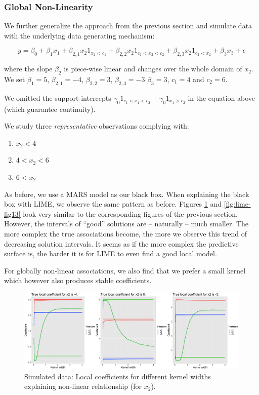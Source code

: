 \documentclass[]{krantz}
\begin{document}
\subsubsection{Global Non-Linearity}\label{id413}

We further generalize the approach from the previous section and
simulate data with the underlying data generating mechanism:

\[ y = \beta_0 + \beta_1 x_1 + \beta_{2,1} x_2 1_{x_2<c_1} + \beta_{2,2} x_2 1_{c_1 < x_2 < c_2} +  \beta_{2,3} x_2 1_{c_2 < x_2} + \beta_3 x_3 + \epsilon \]

where the slope \(\beta_2\) is piece-wise linear and changes over the
whole domain of \(x_2\). We set \(\beta_1 = 5\), \(\beta_{2,1} = -4\),
\(\beta_{2,2} = 3\), \(\beta_{2,3} = -3\) \(\beta_3 = 3\), \(c_1 = 4\)
and \(c_2 = 6\).

We omitted the support intercepts
\(\gamma_0 1_{c_1 < x_1 < c_2} + \gamma_0 1_{x_1 > c_2}\) in the
equation above (which guarantee continuity).

We study three \emph{representative} observations complying with:

\begin{enumerate}
\def\labelenumi{\arabic{enumi}.}
\item
  \(x_2 < 4\)
\item
  \(4 < x_2 < 6\)
\item
  \(6 < x_2\)
\end{enumerate}

As before, we use a MARS model as our black box. When explaining the
black box with LIME, we observe the same pattern as before. Figures
\ref{fig:lime-fig12} and \ref{fig:lime-fig13} look very similar to the
corresponding figures of the previous section. However, the intervals of
``good'' solutions are -- naturally -- much smaller. The more complex
the true associations become, the more we observe this trend of
decreasing solution intervals. It seems as if the more complex the
predictive surface is, the harder it is for LIME to even find a good
local model.

For globally non-linear associations, we also find that we prefer a
small kernel which however also produces stable coefficients.

\begin{figure}

{\centering \includegraphics[width=0.99\linewidth]{images/04-09-12} 

}

\caption{Simulated data: Local coefficients for different kernel widths explaining non-linear relationship (for $x_2$).}\label{fig:lime-fig12}
\end{figure}
\end{document}
